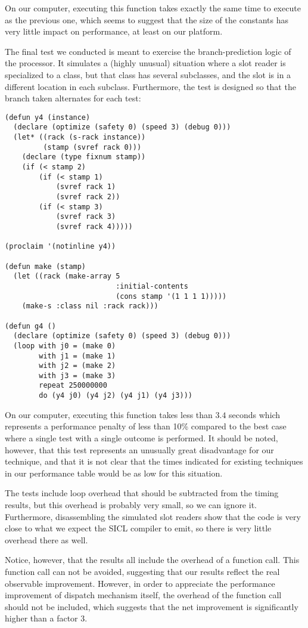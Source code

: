 On our computer, executing this function takes exactly the same time to
execute as the previous one, which seems to suggest that the size of
the constants has very little impact on performance, at least on our
platform.

The final test we conducted is meant to exercise the branch-prediction
logic of the processor.  It simulates a (highly unusual) situation
where a slot reader is specialized to a class, but that class has
several subclasses, and the slot is in a different location in each
subclass.  Furthermore, the test is designed so that the branch taken
alternates for each test:

{\small\begin{verbatim}
(defun y4 (instance)
  (declare (optimize (safety 0) (speed 3) (debug 0)))
  (let* ((rack (s-rack instance))
         (stamp (svref rack 0)))
    (declare (type fixnum stamp))
    (if (< stamp 2)
        (if (< stamp 1)
            (svref rack 1)
            (svref rack 2))
        (if (< stamp 3)
            (svref rack 3)
            (svref rack 4)))))

(proclaim '(notinline y4))

(defun make (stamp)
  (let ((rack (make-array 5
                          :initial-contents
                          (cons stamp '(1 1 1 1)))))
    (make-s :class nil :rack rack)))

(defun g4 ()
  (declare (optimize (safety 0) (speed 3) (debug 0)))
  (loop with j0 = (make 0)
        with j1 = (make 1)
        with j2 = (make 2)
        with j3 = (make 3)
        repeat 250000000
        do (y4 j0) (y4 j2) (y4 j1) (y4 j3)))
\end{verbatim}}

On our computer, executing this function takes less than $3.4$ seconds
which represents a performance penalty of less than 10\% compared to
the best case where a single test with a single outcome is performed.
It should be noted, however, that this test represents an unusually
great disadvantage for our technique, and that it is not clear that
the times indicated for existing techniques in our performance table would
be as low for this situation.

The tests include loop overhead that should be subtracted from the
timing results, but this overhead is probably very small, so we can
ignore it.  Furthermore, disassembling the simulated slot readers show
that the code is very close to what we expect the SICL compiler to
emit, so there is very little overhead there as well.  

Notice, however, that the results all include the overhead of a
function call.  This function call can not be avoided, suggesting
that our results reflect the real observable improvement.  However,
in order to appreciate the performance improvement of dispatch
mechanism itself, the overhead of the function call should not be
included, which suggests that the net improvement is significantly
higher than a factor $3$. 



